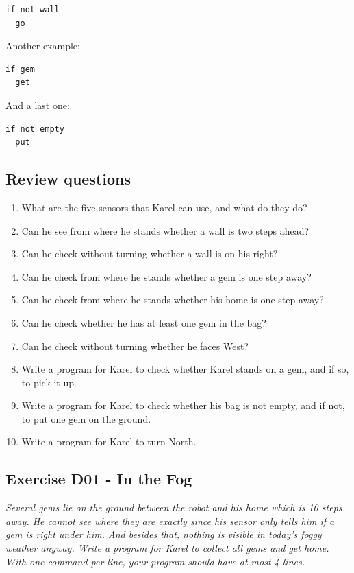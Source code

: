\documentclass[article,A4,12pt]{llncs}
\begin{document}
\begin{verbatim}
if not wall
  go
\end{verbatim}
Another example:
 
\begin{verbatim}
if gem
  get
\end{verbatim}
And a last one:
 
\begin{verbatim}
if not empty
  put
\end{verbatim}


\subsection{Review questions}

\begin{enumerate}
\item What are the five sensors that Karel can use, and what do they do?
\item Can he  see from where he stands whether a wall is two steps ahead?
\item Can he check without turning whether a wall is on his right?
\item Can he check from where he stands whether a gem is one step away?
\item Can he check from where he stands whether his home is one step away?
\item Can he check whether he has at least one gem in the bag?
\item Can he check without turning whether he faces West?
\item Write a program for Karel to check whether Karel stands on a gem, and if so, to pick it up.
\item Write a program for Karel to check whether his bag is not empty, and if not, to put one gem on the ground. 
\item Write a program for Karel to turn North. 

\end{enumerate}

\subsection{Exercise D01 - In the Fog}

{\em Several gems lie on the ground between the robot and his home which is 10 steps away. 
He cannot see where they are exactly since his sensor only tells him if a gem is right 
under him.  And besides that, nothing is visible in today's foggy weather anyway. 
Write a program for Karel to collect all gems and get home. With one command per 
line, your program should have at most 4 lines.}
\end{document}
